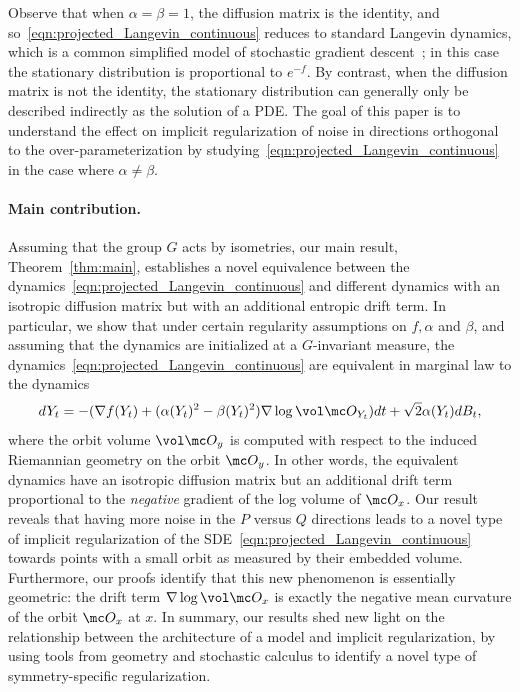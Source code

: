 \documentclass[twoside,a4paper,11pt]{article}
\theoremstyle{plain}
\begin{document}
Observe that when $\alpha = \beta = 1$,
the diffusion matrix is the identity,
and so~\eqref{eqn:projected_Langevin_continuous}
reduces to standard Langevin dynamics, which 
is a common simplified model of stochastic gradient 
descent~\cite{raginsky2017non}; in this case the stationary distribution
is proportional to $e^{-f}$.
By contrast, when the diffusion matrix
is not the identity, the stationary distribution
can generally only be described indirectly as the
solution of a PDE.
The goal of this paper is to understand the effect on implicit regularization of noise in directions
orthogonal to the over-parameterization
by studying~\eqref{eqn:projected_Langevin_continuous}
in the case where
$\alpha \neq \beta$.









\paragraph*{Main contribution.}
Assuming that the group $G$ acts by isometries,
our main result, Theorem~\ref{thm:main}, establishes
a novel equivalence
between the dynamics~\eqref{eqn:projected_Langevin_continuous}
and different dynamics with an isotropic diffusion matrix but with an additional
entropic drift term.
In particular, we show that under certain
regularity assumptions on $f,\alpha$
and $\beta$,
and assuming that the dynamics are initialized at a $G$-invariant
measure, the dynamics~\eqref{eqn:projected_Langevin_continuous}
are equivalent in marginal law to the dynamics
$$
dY_t = -(\nabla f(Y_t) + (\alpha(Y_t)^2 - \beta(Y_t)^2)\nabla \log \vol \mc O_{Y_t})dt + \sqrt{2} \alpha(Y_t) dB_t,
$$ where the orbit volume $\vol \mc O_y$ is computed with respect
 to the induced Riemannian geometry on the orbit $\mc O_y$.
 In other words, the equivalent dynamics
 have an isotropic diffusion matrix but an additional
 drift term proportional to the {\it negative} gradient
 of the log volume of $\mc O_x$.
Our result reveals that having more noise in the
$P$ versus $Q$ directions leads to
a novel type of implicit regularization of the SDE~\eqref{eqn:projected_Langevin_continuous} towards
points with a small orbit as measured by their embedded volume.
Furthermore, our proofs identify that this new phenomenon is essentially
geometric: 
 the drift term $\nabla \log \vol \mc O_{x}$
 is exactly the negative mean curvature of the orbit $\mc O_x$ at $x$.
 In summary, our results shed new light on 
 the relationship
 between the architecture of a model
 and implicit regularization, by using
 tools from geometry and stochastic calculus to identify a novel type of
 symmetry-specific regularization.
 
\end{document}
